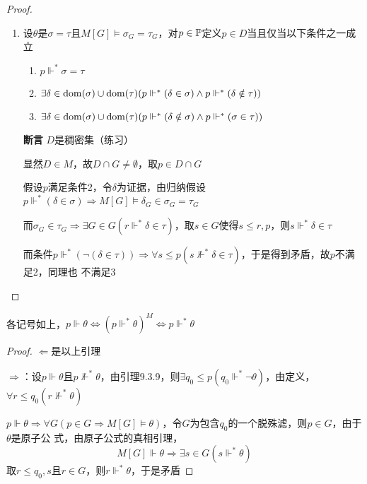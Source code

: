 \documentclass[11pt]{article}
\begin{document}
\begin{proof}
\begin{enumerate}
\begin{enumerate}
\item 设\(\theta\)是\(\sigma=\tau\)且\(M[G]\vDash\sigma_G=\tau_G\)，对\(p\in\P\)定义\(p\in D\)当且仅当以下条件之一成立
\begin{enumerate}
\item \(p\Vdash^*\sigma=\tau\)
\item \(\exists\delta\in\dom(\sigma)\cup\dom(\tau)(p\Vdash^*(\delta\in\sigma)\wedge p\Vdash^*(\delta\notin\tau))\)
\item \(\exists\delta\in\dom(\sigma)\cup\dom(\tau)(p\Vdash^*(\delta\notin\sigma)\wedge p\Vdash^*(\sigma\in\tau))\)
\end{enumerate}
\textbf{断言} \(D\)是稠密集（练习）

显然\(D\in M\)，故\(D\cap G\neq\emptyset\)，取\(p\in D\cap G\)

假设\(p\)满足条件2，令\(\delta\)为证据，由归纳假设
\(p\Vdash^*(\delta\in\sigma)\Rightarrow M[G]\vDash\delta_G\in\sigma_G=\tau_G\)

而\(\sigma_G\in\tau_G\Rightarrow\exists G\in G(r\Vdash^*\delta\in\tau)\)，取\(s\in G\)使得\(s\le r,p\)，则\(s\Vdash^*\delta\in\tau\)

而条件\(p\Vdash^*(\neg(\delta\in\tau))\Rightarrow\forall s\le p(s\not\Vdash^*\delta\in\tau)\)，于是得到矛盾，故\(p\)不满足2，同理也
不满足3
\end{enumerate}
\end{enumerate}
\end{proof}

\begin{lemma}[力迫原子公式的可定义性]
\label{9.3.11}
各记号如上，\(p\Vdash\theta\Leftrightarrow(p\Vdash^*\theta)^M\Leftrightarrow p\Vdash^*\theta\)
\end{lemma}

\begin{proof}
\(\Leftarrow\)是以上引理

\(\Rightarrow\)：设\(p\Vdash\theta\)且\(p\not\Vdash^*\theta\)，由引理9.3.9，则\(\exists q_0\le p(q_0\Vdash^*\neg\theta)\)，由定义，
\(\forall r\le q_0(r\not\Vdash^*\theta)\)

\(p\Vdash\theta\Rightarrow\forall G(p\in G\Rightarrow M[G]\vDash\theta)\)，令\(G\)为包含\(q_0\)的一个脱殊滤，则\(p\in G\)，由于\(\theta\)是原子公
式，由原子公式的真相引理，
\begin{equation*}
M[G]\Vdash\theta\Rightarrow\exists s\in G(s\Vdash^*\theta)
\end{equation*}
取\(r\le q_0,s\)且\(r\in G\)，则\(r\Vdash^*\theta\)，于是矛盾
\end{proof}
\end{document}
